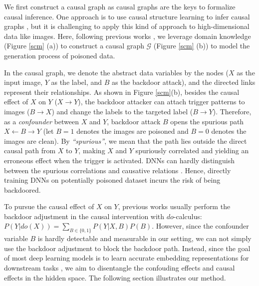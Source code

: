 We first construct a causal graph as causal graphs are the keys to formalize causal inference. One
approach is to use causal structure learning to infer causal graphs \cite{causality},
but it is challenging to apply this kind of approach to high-dimensional data like images. Here, following previous works \cite{zhang2020causal, zhang2022adversarial, niu2021counterfactual}, we leverage domain knowledge (Figure \ref{scm} (a)) to construct a causal graph $\mathcal{G}$ (Figure \ref{scm} (b)) to model the generation process of poisoned data.

In the causal graph, we denote the abstract data variables by the nodes ($X$ as the input image, $Y$ as the label, and $B$ as the backdoor attack), and the directed links represent their relationships. As shown in Figure \ref{scm}(b), besides the causal effect of $X$ on $Y$ ($X \rightarrow Y$), the backdoor attacker can attach trigger patterns to images ($B \rightarrow X$) and change the labels to the targeted label ($B \rightarrow Y$). Therefore, as a \emph{confounder} between $X$ and $Y$, backdoor attack $B$ opens the spurious path $X \leftarrow B \rightarrow Y$ (let $B=1$ denotes the images are poisoned and $B=0$ denotes the images are clean). By \emph{“spurious”}, we mean that the path lies outside the direct causal path from $X$ to $Y$, making $X$ and $Y$ spuriously correlated and yielding an erroneous effect when the trigger is activated. DNNs can hardly distinguish between the spurious correlations and causative relations \cite{bookwhy}. Hence, directly training DNNs on potentially poisoned dataset incurs the risk of being backdoored. 

To pursue the causal effect of $X$ on $Y$, previous works usually perform the backdoor adjustment in the causal intervention \cite{bookwhy} with $do$-calculus: $P(Y |do(X)) = \sum_{B\in \{0,1\}} P(Y|X,B)P(B)$. 
However, since the confounder variable $B$ is hardly detectable and measurable in our setting, we can not simply use the backdoor adjustment to block the backdoor path. 
Instead, since the goal of most deep learning models is to learn accurate embedding representations for downstream tasks \cite{alemi2016deep, huang2021disenqnet, wang2020cross, hamaguchi2019rare}, we aim to disentangle the confouding effects and causal effects in the hidden space. The following section illustrates our method.

